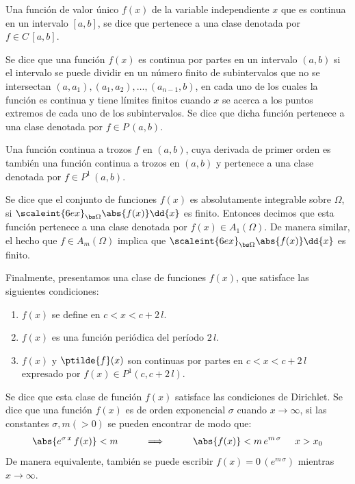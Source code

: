 Una función de valor único $f (x)$ de la variable independiente $x$ que es continua en un intervalo $[a, b]$, se dice que pertenece a una clase denotada por $f \in C \, [a, b]$.
\par
Se dice que una función $f (x)$ es continua por partes en un intervalo $(a, b)$ si el intervalo se puede dividir en un número finito de subintervalos que no se intersectan $(a, a_{1}), (a_{1}, a_{2}), \ldots, (a_{n -1}, b)$, en cada uno de los cuales la función es continua y tiene límites finitos cuando $x$ se acerca a los puntos extremos de cada uno de los subintervalos. Se dice que dicha función pertenece a una clase denotada por $f \in P \, (a, b)$.
\par
Una función continua a trozos $f$ en $(a, b)$, cuya derivada de primer orden es también una función continua a trozos en $(a, b)$ y pertenece a una clase denotada por $f \in P^{1} \, (a, b)$.
\par
Se dice que el conjunto de funciones $f (x)$ es absolutamente integrable sobre $\Omega$, si $\scaleint{6ex}_{\bs \Omega}  \abs{f (x)} \dd{x}$ es finito. Entonces decimos que esta función pertenece a una clase denotada por $f (x) \in A_{1} (\Omega)$. De manera similar, el hecho que $f \in A_{m} (\Omega)$ implica que $\scaleint{6ex}_{\bs \Omega}  \abs{f (x)} \dd{x}$ es finito.
\par
Finalmente, presentamos una clase de funciones $f (x)$, que satisface las siguientes condiciones:
\begin{enumerate}[label=\roman*]
\item $f (x)$ se define en $c < x < c + 2 \, l$.
\item $f (x)$ es una función periódica del período $2 \, l$.
\item $f (x)$ y $\ptilde{f} (x)$ son continuas por partes en $c  < x <c + 2 \, l$ expresado por $f (x) \in P^{1} (c, c + 2 \, l)$.
\end{enumerate}
Se dice que esta clase de función $f (x)$ satisface las condiciones de Dirichlet. Se dice que una función $f (x)$ es de orden exponencial $\sigma$ cuando $x \to \infty$, si las constantes $\sigma, m (> 0)$ se pueden encontrar de modo que:
\begin{align*}
\abs{ e^{\sigma \, x} \, f(x)} < m \hspace{1cm} \Longrightarrow \hspace{1cm} \abs{f(x)} < m \, e^{m \, \sigma} \hspace{0.5cm} x > x_{0}
\end{align*}
De manera equivalente, también se puede escribir $f (x) = 0 \, (e^{m \, \sigma})$ mientras $x \to \infty$.

